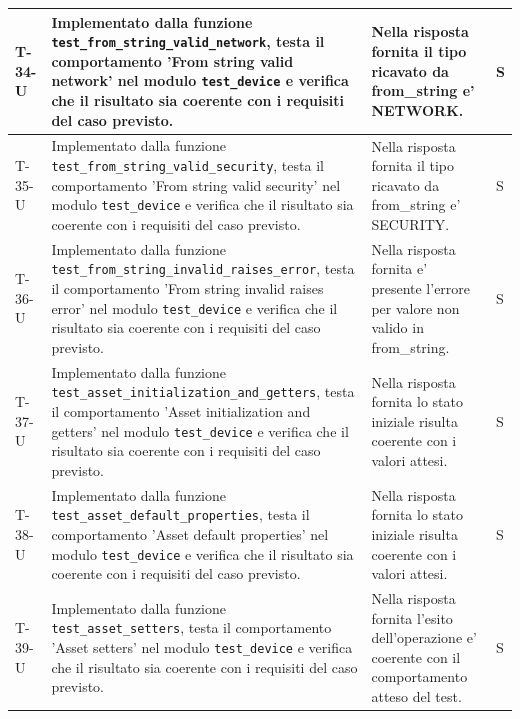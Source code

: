 \documentclass[a4paper,12pt]{article}
\begin{document}
{{\begin{longtable}{|>{\RaggedRight\arraybackslash}p{1.55cm}|>{\RaggedRight\arraybackslash}p{8.0cm}|>{\RaggedRight\arraybackslash}p{4.6cm}|>{\RaggedRight\arraybackslash}p{1.2cm}|}
        \hline
        T-34-U & Implementato dalla funzione \texttt{test\_\allowbreak from\_\allowbreak string\_\allowbreak valid\_\allowbreak network}, testa il comportamento 'From string valid network' nel modulo \texttt{test\_\allowbreak device} e verifica che il risultato sia coerente con i requisiti del caso previsto. & Nella risposta fornita il tipo ricavato da from\_string e' NETWORK. & S \\
        \hline
        T-35-U & Implementato dalla funzione \texttt{test\_\allowbreak from\_\allowbreak string\_\allowbreak valid\_\allowbreak security}, testa il comportamento 'From string valid security' nel modulo \texttt{test\_\allowbreak device} e verifica che il risultato sia coerente con i requisiti del caso previsto. & Nella risposta fornita il tipo ricavato da from\_string e' SECURITY. & S \\
        \hline
        T-36-U & Implementato dalla funzione \texttt{test\_\allowbreak from\_\allowbreak string\_\allowbreak invalid\_\allowbreak raises\_\allowbreak error}, testa il comportamento 'From string invalid raises error' nel modulo \texttt{test\_\allowbreak device} e verifica che il risultato sia coerente con i requisiti del caso previsto. & Nella risposta fornita e' presente l'errore per valore non valido in from\_string. & S \\
        \hline
        T-37-U & Implementato dalla funzione \texttt{test\_\allowbreak asset\_\allowbreak initialization\_\allowbreak and\_\allowbreak getters}, testa il comportamento 'Asset initialization and getters' nel modulo \texttt{test\_\allowbreak device} e verifica che il risultato sia coerente con i requisiti del caso previsto. & Nella risposta fornita lo stato iniziale risulta coerente con i valori attesi. & S \\
        \hline
        T-38-U & Implementato dalla funzione \texttt{test\_\allowbreak asset\_\allowbreak default\_\allowbreak properties}, testa il comportamento 'Asset default properties' nel modulo \texttt{test\_\allowbreak device} e verifica che il risultato sia coerente con i requisiti del caso previsto. & Nella risposta fornita lo stato iniziale risulta coerente con i valori attesi. & S \\
        \hline
        T-39-U & Implementato dalla funzione \texttt{test\_\allowbreak asset\_\allowbreak setters}, testa il comportamento 'Asset setters' nel modulo \texttt{test\_\allowbreak device} e verifica che il risultato sia coerente con i requisiti del caso previsto. & Nella risposta fornita l'esito dell'operazione e' coerente con il comportamento atteso del test. & S \\

\end{longtable}}}
\end{document}
